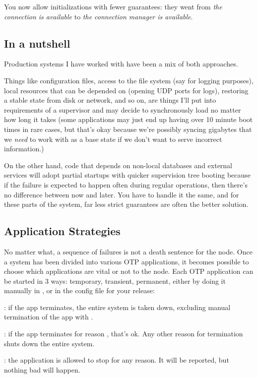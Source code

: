 You now allow initializations with fewer guarantees: they went from \emph{the connection is available} to \emph{the connection manager is available}.

\subsection{In a nutshell}
\label{subsec:start-link-in-a-nutshell}

Production systems I have worked with have been a mix of both approaches.

Things like configuration files, access to the file system (say for logging purposes), local resources that can be depended on (opening UDP ports for logs), restoring a stable state from disk or network, and so on, are things I'll put into requirements of a supervisor and may decide to synchronously load no matter how long it takes (some applications may just end up having over 10 minute boot times in rare cases, but that's okay because we're possibly syncing gigabytes that we \emph{need} to work with as a base state if we don't want to serve incorrect information.)

On the other hand, code that depends on non-local databases and external services will adopt partial startups with quicker supervision tree booting because if the failure is expected to happen often during regular operations,
then there's no difference between now and later. You have to handle it the same, and for these parts of the system, far less strict guarantees are often the better solution.

\subsection{Application Strategies}
\label{subsec:start-link-application-strategies}

No matter what, a sequence of failures is not a death sentence for the node. Once a system has been divided into various OTP applications, it becomes possible to choose which applications are vital or not to the node. Each OTP application can be started in 3 ways: temporary, transient, permanent, either by doing it manually in , or in the config file for your release:

\begin{itemize*}
	\item {}: if the app terminates, the entire system is taken down, excluding manual termination of the app with .
	\item {}: if the app terminates for reason , that's ok. Any other reason for termination shuts down the entire system.
	\item {}: the application is allowed to stop for any reason. It will be reported, but nothing bad will happen.
\end{itemize*}

